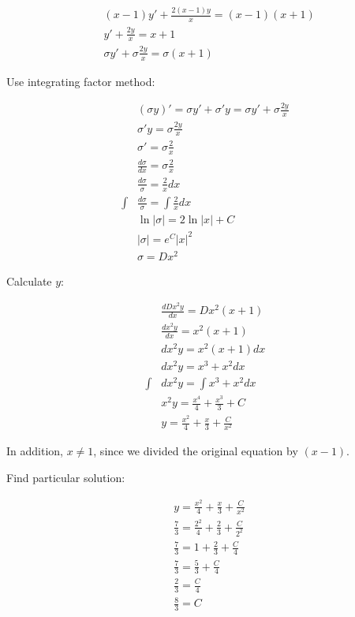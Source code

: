 \documentclass[titlepage]{article}
\begin{document}
\begin{align*}
  & (x-1)y' + \frac{2(x-1)y}{x} = (x-1)(x+1)
  \\ & y' + \frac{2y}{x} = x+1 \tag{$x \neq 1$}
  \\ & \sigma y' + \sigma \frac{2y}{x} = \sigma(x+1)
\end{align*}

Use integrating factor method:

\begin{align*}
  & (\sigma y)' = \sigma y' + \sigma' y = \sigma y' + \sigma \frac{2y}{x}
  \\ & \sigma' y = \sigma \frac{2y}{x}
  \\ & \sigma' = \sigma \frac{2}{x}
  \\ & \frac{d\sigma}{dx} = \sigma \frac{2}{x}
  \\ & \frac{d\sigma}{\sigma} = \frac{2}{x} dx
  \\ \int & \frac{d\sigma}{\sigma} = \int \frac{2}{x} dx
  \\ & \ln|\sigma| = 2 \ln|x| + C
  \\ & |\sigma| = e^C|x|^2 \tag{$x \neq 0$}
  \\ & \sigma = Dx^2
\end{align*}

Calculate $y$:

\begin{align*}
  & \frac{dDx^2y}{dx} = Dx^2(x+1)
  \\ & \frac{dx^2y}{dx} = x^2(x+1)
  \\ & dx^2y = x^2(x+1) dx
  \\ & dx^2y = x^3 + x^2 dx
  \\ \int & dx^2y = \int x^3 + x^2 dx
  \\ & x^2y = \frac{x^4}{4} + \frac{x^3}{3} + C
  \\ & y = \frac{x^2}{4} + \frac{x}{3} + \frac{C}{x^2} \tag{$x \neq 0 $}
\end{align*}

In addition, $x \neq 1$, since we divided the original equation by $(x-1)$.

Find particular solution:

\begin{align*}
  & y = \frac{x^2}{4} + \frac{x}{3} + \frac{C}{x^2}
  \\ & \frac{7}{3} = \frac{2^2}{4} + \frac{2}{3} + \frac{C}{2^2}
  \\ & \frac{7}{3} = 1 + \frac{2}{3} + \frac{C}{4}
  \\ & \frac{7}{3} = \frac{5}{3} + \frac{C}{4}
  \\ & \frac{2}{3} = \frac{C}{4}
  \\ & \frac{8}{3} = C
\end{align*}
\end{document}
